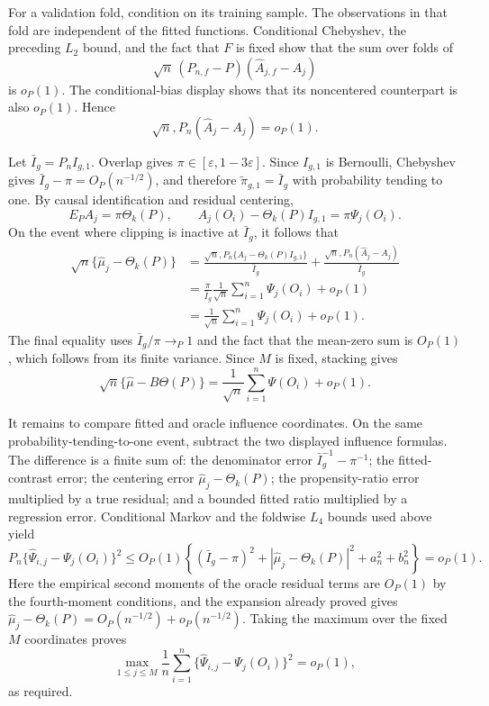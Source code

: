 For a validation fold, condition on its training sample.  The observations in that fold are independent of the fitted functions.  Conditional Chebyshev, the preceding \(L_2\) bound, and the fact that \(F\) is fixed show that the sum over folds of
\[
 \sqrt n\,(P_{n,f}-P)(\widehat A_{j,f}-A_j)
\]
is \(o_P(1)\).  The conditional-bias display shows that its noncentered counterpart is also \(o_P(1)\).  Hence
\[
 \sqrt n,P_n(\widehat A_j-A_j)=o_P(1).
\]

Let \(\bar I_g=P_nI_{g,1}\).  Overlap gives \(\pi\in[\varepsilon,1-3\varepsilon]\).  Since \(I_{g,1}\) is Bernoulli, Chebyshev gives \(\bar I_g-\pi=O_P(n^{-1/2})\), and therefore \(\widetilde\pi_{g,1}=\bar I_g\) with probability tending to one.  By causal identification and residual centering,
\[
 E_P A_j=\pi\Theta_k(P),
 \qquad
 A_j(O_i)-\Theta_k(P)I_{g,1}=\pi\Psi_j(O_i).
\]
On the event where clipping is inactive at \(\bar I_g\), it follows that
\[
\begin{aligned}
 \sqrt n\{\widehat\mu_j-\Theta_k(P)\}
 &=\frac{\sqrt n,P_n\{A_j-\Theta_k(P)I_{g,1}\}}
         {\bar I_g}
   +\frac{\sqrt n,P_n(\widehat A_j-A_j)}{\bar I_g}\\
 &=\frac{\pi}{\bar I_g}\frac1{\sqrt n}
   \sum_{i=1}^n\Psi_j(O_i)+o_P(1)\\
 &=\frac1{\sqrt n}\sum_{i=1}^n\Psi_j(O_i)+o_P(1).
\end{aligned}
\]
The final equality uses \(\bar I_g/\pi\to_P1\) and the fact that the mean-zero sum is \(O_P(1)\), which follows from its finite variance.  Since \(M\) is fixed, stacking gives
\[
 \sqrt n\{\widehat\mu-B\Theta(P)\}
 =\frac1{\sqrt n}\sum_{i=1}^n\Psi(O_i)+o_P(1).
\]

It remains to compare fitted and oracle influence coordinates.  On the same probability-tending-to-one event, subtract the two displayed influence formulas.  The difference is a finite sum of: the denominator error \(\bar I_g^{-1}-\pi^{-1}\); the fitted-contrast error; the centering error \(\widehat\mu_j-\Theta_k(P)\); the propensity-ratio error multiplied by a true residual; and a bounded fitted ratio multiplied by a regression error.  Conditional Markov and the foldwise \(L_4\) bounds used above yield
\[
 P_n\{\widehat\Psi_{i,j}-\Psi_j(O_i)\}^2
 \le O_P(1)\left\{(\bar I_g-\pi)^2
 +|\widehat\mu_j-\Theta_k(P)|^2+a_n^2+b_n^2\right\}=o_P(1).
\]
Here the empirical second moments of the oracle residual terms are \(O_P(1)\) by the fourth-moment conditions, and the expansion already proved gives \(\widehat\mu_j-\Theta_k(P)=O_P(n^{-1/2})+o_P(n^{-1/2})\).  Taking the maximum over the fixed \(M\) coordinates proves
\[
 \max_{1\le j\le M}\frac1n\sum_{i=1}^n
 \{\widehat\Psi_{i,j}-\Psi_j(O_i)\}^2=o_P(1),
\]
as required.
